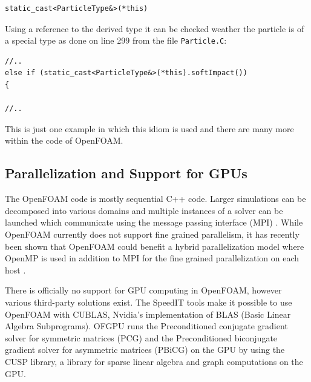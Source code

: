 \begin{lstlisting}
static_cast<ParticleType&>(*this)
\end{lstlisting}

Using a reference to the derived type it can be checked weather the particle is of a special type as done on line 299 from the file \verb+Particle.C+:

\begin{lstlisting}
//..
else if (static_cast<ParticleType&>(*this).softImpact())
{

//..
\end{lstlisting}

This is just one example in which this idiom is used and there are many more within the code of OpenFOAM.

\subsection{Parallelization and Support for GPUs}

The OpenFOAM code is mostly sequential C++ code. Larger simulations can be decomposed into various domains and multiple instances of a solver can be launched which communicate using the message passing interface (MPI) \cite{openfoamParallel}. While OpenFOAM currently does not support fine grained parallelism, it has recently been shown that OpenFOAM could benefit a hybrid parallelization model where OpenMP is used in addition to MPI for the fine grained parallelization on each host \cite{liu11}.

There is officially no support for GPU computing in OpenFOAM, however various third-party solutions exist. The \cite{speedit} SpeedIT tools make it possible to use OpenFOAM with CUBLAS, Nvidia's implementation of BLAS (Basic Linear Algebra Subprograms). OFGPU \cite{ofgpu} runs the Preconditioned conjugate gradient solver for symmetric matrices (PCG) and the Preconditioned biconjugate gradient solver for asymmetric matrices (PBiCG) on the GPU by using the CUSP \cite{cusp} library, a library for sparse linear algebra and graph computations on the GPU.
